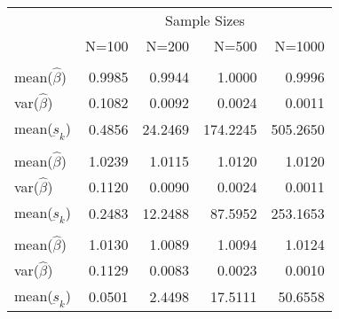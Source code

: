 
\begin{tabular}{lrrrr}
\toprule
\multicolumn{1}{c}{ } & \multicolumn{4}{c}{Sample Sizes} \\
\cmidrule(l{3pt}r{3pt}){2-5}
  & N=100 & N=200 & N=500 & N=1000\\
\midrule
\addlinespace[0.3em]
\multicolumn{5}{l}{\textbf{$ \rho = 0 $  }}\\
\hspace{1em}mean($\hat{\beta}$) & 0.9985 & 0.9944 & 1.0000 & 0.9996\\
\hspace{1em}var($\hat{\beta}$) & 0.1082 & 0.0092 & 0.0024 & 0.0011\\
\hspace{1em}mean($\underbar{s}_k$) & 0.4856 & 24.2469 & 174.2245 & 505.2650\\
\addlinespace[0.3em]
\multicolumn{5}{l}{\textbf{$ \rho = 0.5 $}}\\
\hspace{1em}mean($\hat{\beta}$) & 1.0239 & 1.0115 & 1.0120 & 1.0120\\
\hspace{1em}var($\hat{\beta}$) & 0.1120 & 0.0090 & 0.0024 & 0.0011\\
\hspace{1em}mean($\underbar{s}_k$) & 0.2483 & 12.2488 & 87.5952 & 253.1653\\
\addlinespace[0.3em]
\multicolumn{5}{l}{\textbf{$ \rho = 0.9 $}}\\
\hspace{1em}mean($\hat{\beta}$) & 1.0130 & 1.0089 & 1.0094 & 1.0124\\
\hspace{1em}var($\hat{\beta}$) & 0.1129 & 0.0083 & 0.0023 & 0.0010\\
\hspace{1em}mean($\underbar{s}_k$) & 0.0501 & 2.4498 & 17.5111 & 50.6558\\
\bottomrule
\end{tabular}
